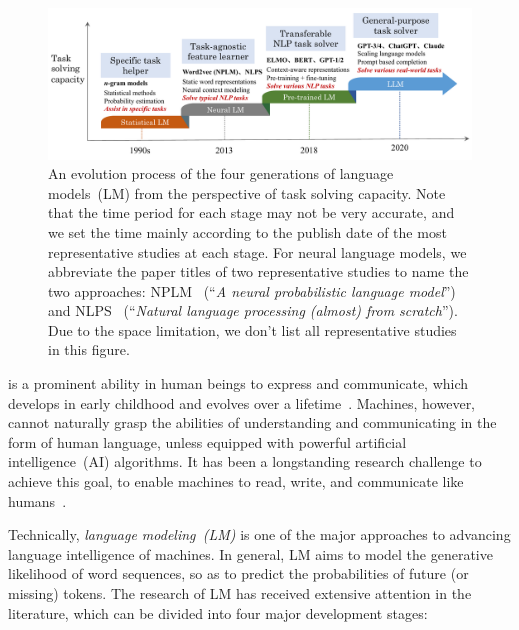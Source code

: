 \begin{figure}
    \centering
\includegraphics[width=.9\textwidth]{images/task-solvers.pdf}
    \caption{An  evolution process of the four generations of language models~(LM) from the perspective of task solving capacity. Note that the time period for each stage may not be very accurate, and we set the time mainly according to the publish date of the most  representative  studies at each stage. For neural language models, we abbreviate the paper titles of two representative studies to name the two approaches: NPLM~\cite{Bengio-JMLR-2003-A}   (``\emph{A neural probabilistic language model}'') and NLPS~\cite{Collobert-JMLR-2011}    (``\emph{Natural language processing (almost) from scratch}''). Due to the space limitation, we don't list all representative studies in this figure. } \label{fig:task_solvers}
\end{figure}

  is a prominent ability in human beings to express and communicate, which develops in early childhood and evolves over a lifetime~\cite{instinct-book,hauser-science-2002-faculty}.  Machines, however, cannot naturally grasp the abilities of understanding and communicating in the form of human language, unless equipped with powerful artificial intelligence~(AI) algorithms. It has been a longstanding research challenge to achieve this goal, to enable machines to read, write, and communicate like humans~\cite{turing-test}. 


Technically, \emph{language modeling~(LM)} is one of the major approaches to advancing language intelligence of machines.  
In general, LM aims to model  the generative likelihood of word sequences, so as to predict the probabilities of future (or missing) tokens. 
The research of LM has received extensive attention in the literature, which can be divided into four major development stages:   


